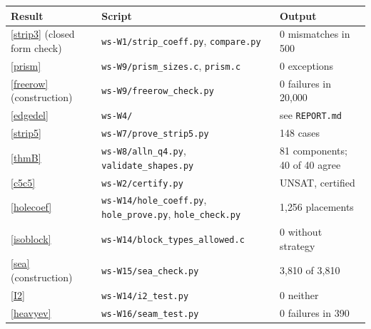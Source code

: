 \documentclass[11pt,oneside,openany]{book}
\newcounter{res}[chapter]
\begin{document}
\begin{center}\small
\renewcommand{\arraystretch}{1.15}
\begin{tabular}{p{4.6cm}p{5.4cm}p{4cm}}
\toprule
Result & Script & Output\\
\midrule
\ref{strip3} (closed form check) & \texttt{ws-W1/strip\_coeff.py}, \texttt{compare.py} & 0 mismatches in 500\\
\ref{prism} & \texttt{ws-W9/prism\_sizes.c}, \texttt{prism.c} & 0 exceptions\\
\ref{freerow} (construction) & \texttt{ws-W9/freerow\_check.py} & 0 failures in 20{,}000\\
\ref{edgedel} & \texttt{ws-W4/} & see \texttt{REPORT.md}\\
\ref{strip5} & \texttt{ws-W7/prove\_strip5.py} & 148 cases\\
\ref{thmB} & \texttt{ws-W8/alln\_q4.py}, \texttt{validate\_shapes.py} & 81 components; 40 of 40 agree\\
\ref{c5c5} & \texttt{ws-W2/certify.py} & UNSAT, certified\\
\ref{holecoef} & \texttt{ws-W14/hole\_coeff.py}, \texttt{hole\_prove.py}, \texttt{hole\_check.py} & 1{,}256 placements\\
\ref{isoblock} & \texttt{ws-W14/block\_types\_allowed.c} & 0 without strategy\\
\ref{sea} (construction) & \texttt{ws-W15/sea\_check.py} & 3{,}810 of 3{,}810\\
\ref{I2} & \texttt{ws-W14/i2\_test.py} & 0 neither\\
\ref{heavyev} & \texttt{ws-W16/seam\_test.py} & 0 failures in 390\\
\bottomrule
\end{tabular}
\end{center}
\end{document}
